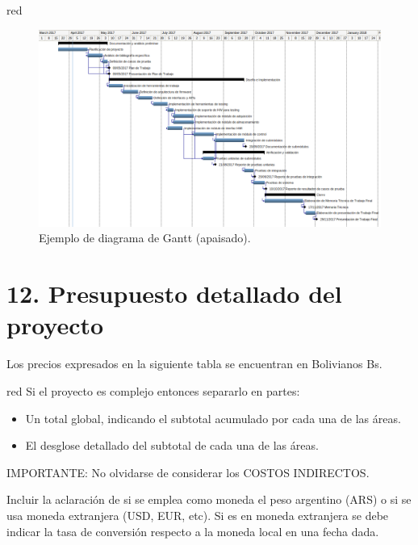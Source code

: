 \documentclass[
11pt, %
codirector, %
]{charter}
\begin{document}
\begin{consigna}{red}
\begin{landscape}
\begin{figure}[htpb]
\centering 
\includegraphics[height=.85\textheight]{./Figuras/Gantt-2.png}
\caption{Ejemplo de diagrama de Gantt (apaisado).} %
\label{fig:diagGantt}
\end{figure}

\end{landscape}

\end{consigna}


\section{12. Presupuesto detallado del proyecto}
\label{sec:presupuesto}
Los precios expresados en la siguiente tabla se encuentran en Bolivianos Bs.
\begin{consigna}{red}
Si el proyecto es complejo entonces separarlo en partes:
\begin{itemize}
	\item Un total global, indicando el subtotal acumulado por cada una de las áreas.
	\item El desglose detallado del subtotal de cada una de las áreas.
\end{itemize}

IMPORTANTE: No olvidarse de considerar los COSTOS INDIRECTOS.

Incluir la aclaración de si se emplea como moneda el peso argentino (ARS) o si se usa moneda extranjera (USD, EUR, etc). Si es en moneda extranjera se debe indicar la tasa de conversión respecto a la moneda local en una fecha dada.

\end{consigna}
\end{document}
